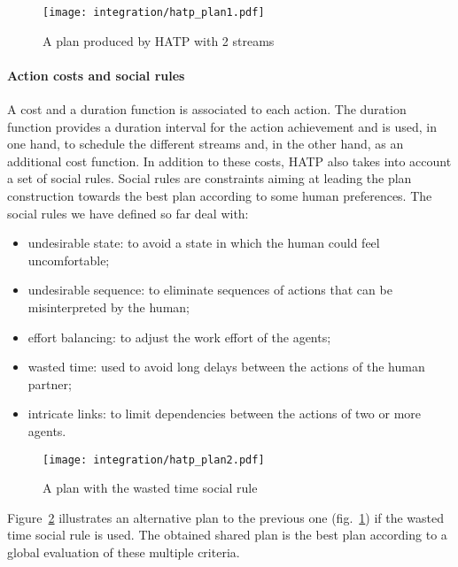 \begin{figure}[htbp]
  \centering
  \texttt{[image: integration/hatp\_plan1.pdf]}
  \caption{A plan produced by HATP with 2 streams}
  \label{plan_hatp1}
\end{figure}

\paragraph{Action costs and social rules} A cost and a duration function is
associated to each action.  The duration function provides a duration interval
for the action achievement and is used, in one hand, to schedule the different
streams and, in the other hand, as an additional cost function.  In addition to
these costs, HATP also takes into account a set of social rules.  Social rules
are constraints aiming at leading the plan construction towards the best plan
according to some human preferences. The social rules we have defined so far
deal with:

\begin{itemize}

    \item undesirable state: to avoid a state in which the human could feel
    uncomfortable;

    \item undesirable sequence: to eliminate sequences of actions that can be
    misinterpreted by the human;

    \item effort balancing: to adjust the work effort of the agents;

    \item wasted time: used to avoid long delays between the actions of the
    human partner;

    \item intricate links: to limit dependencies between the actions of two or
    more agents.

\end{itemize}

\begin{figure}[htbp]
  \centering
  \texttt{[image: integration/hatp\_plan2.pdf]}
  \caption{A plan with the wasted time social rule}
  \label{plan_hatp2}
\end{figure}

Figure~\ref{plan_hatp2} illustrates an alternative plan to the previous one
(fig.~\ref{plan_hatp1}) if the wasted time social rule is used.  The obtained
shared plan is the best plan according to a global evaluation of these multiple
criteria.

